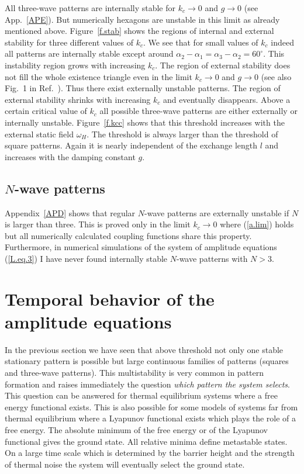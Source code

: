 All three-wave patterns are internally stable for $k_c\to 0$ and
$g\to 0$ (see App.~\ref{APE}). But numerically hexagons are unstable
in this limit as already mentioned above.  Figure~\ref{f.stab} shows
the regions of internal and external stability for three different 
values of $k_c$. We see that for small values of $k_c$ indeed all
patterns are internally stable except around
$\alpha_2-\alpha_1=\alpha_3-\alpha_2=60^\circ$. This instability
region grows with increasing $k_c$. The region of external stability
does not fill the whole existence triangle even in the limit $k_c\to
0$ and $g\to 0$ (see also Fig.~1 in Ref.~). Thus
there exist externally unstable patterns. The region of external
stability shrinks with increasing $k_c$ and eventually disappears.
Above a certain critical value of $k_c$ all possible three-wave
patterns are either externally or internally unstable.
Figure~\ref{f.kcc} shows that this threshold increases with the
external static field $\omega_H$. The threshold is always larger than
the threshold of square patterns. Again it is nearly independent of
the exchange length $l$ and increases with the damping constant $g$.

\subsection{\protect\label{waveN}$N$-wave patterns}

Appendix~\ref{APD} shows that regular $N$-wave patterns are
externally unstable if $N$ is larger than three. This is proved only
in the limit $k_c\to 0$ where (\ref{a.lim}) holds but all numerically
calculated coupling functions share this property. Furthermore, in
numerical simulations of the system of amplitude equations
(\ref{L.eq.3}) I have never found internally stable $N$-wave patterns
with $N>3$.


\section{\protect\label{TEMP}Temporal behavior of 
   the amplitude equations}

In the previous section we have seen that above threshold not only
one stable stationary pattern is possible but large continuous
families of patterns (squares and three-wave patterns). This
multistability is very common in pattern formation\cite{cro.93} and 
raises immediately the question {\em which pattern the system
selects\/}. This question can be answered for thermal equilibrium
systems where a free energy functional exists. This is also possible
for some models of systems far from thermal equilibrium where a
Lyapunov functional exists which plays the role of a free energy. The
absolute minimum of the free energy or of the Lyapunov functional
gives the ground state. All relative minima define metastable states.
On a large time scale which is determined by the barrier height and
the strength of thermal noise the system will eventually select the
ground state. 

